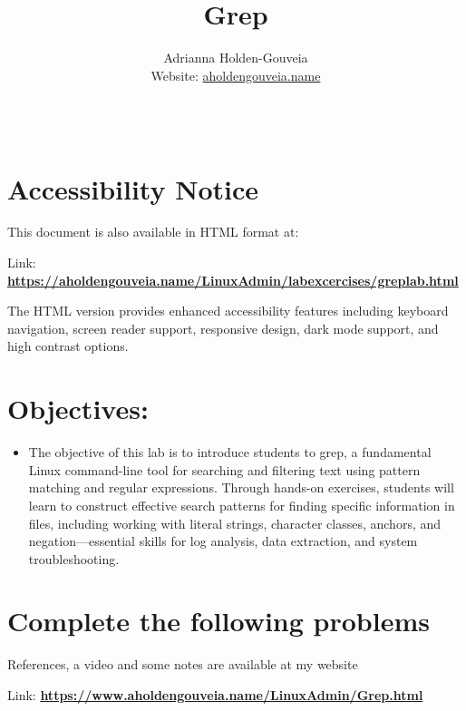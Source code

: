 \documentclass[12pt]{article}
\title{Grep}
\author{
        Adrianna Holden-Gouveia \\
        Website: \href{https://aholdengouveia.name}{aholdengouveia.name}\\
        \date{\vspace{-5ex}} 
        \faGithub {: aholdengouveia} \\
        }
\begin{document}
    

\maketitle



\section*{Accessibility Notice}
This document is also available in HTML format at:

Link: \href{https://aholdengouveia.name/LinuxAdmin/labexcercises/greplab.html}{\textbf{https://aholdengouveia.name/LinuxAdmin/labexcercises/greplab.html}}

The HTML version provides enhanced accessibility features including keyboard navigation, screen reader support, responsive design, dark mode support, and high contrast options.

\section*{Objectives:}
\begin{itemize}
    \item The objective of this lab is to introduce students to grep, a fundamental Linux command-line tool for searching and filtering text using pattern matching and regular expressions. Through hands-on exercises, students will learn to construct effective search patterns for finding specific information in files, including working with literal strings, character classes, anchors, and negation—essential skills for log analysis, data extraction, and system troubleshooting.
\end{itemize}
\section*{Complete the following problems}

References, a video and some notes are available at my website

Link: \href{https://www.aholdengouveia.name/LinuxAdmin/Grep.html}{\textbf{https://www.aholdengouveia.name/LinuxAdmin/Grep.html}}
\end{document}
